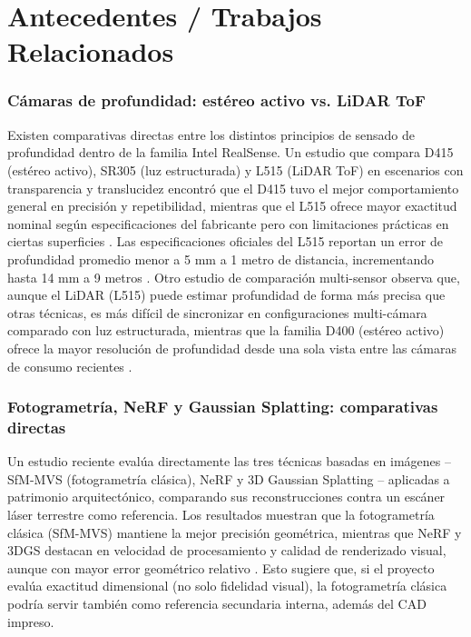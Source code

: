 \documentclass[11pt]{article}
\begin{document}
\section{Antecedentes / Trabajos Relacionados}

\subsubsection*{Cámaras de profundidad: estéreo activo vs. LiDAR ToF}
Existen comparativas directas entre los distintos principios de sensado de profundidad dentro de la familia Intel RealSense. Un estudio que compara D415 (est\'ereo activo), SR305 (luz estructurada) y L515 (LiDAR ToF) en escenarios con transparencia y translucidez encontr\'o que el D415 tuvo el mejor comportamiento general en precisi\'on y repetibilidad, mientras que el L515 ofrece mayor exactitud nominal seg\'un especificaciones del fabricante pero con limitaciones pr\'acticas en ciertas superficies \cite{realsense_transparent}. Las especificaciones oficiales del L515 reportan un error de profundidad promedio menor a 5 mm a 1 metro de distancia, incrementando hasta 14 mm a 9 metros \cite{realsense_l515_specs}. Otro estudio de comparaci\'on multi-sensor observa que, aunque el LiDAR (L515) puede estimar profundidad de forma m\'as precisa que otras t\'ecnicas, es m\'as dif\'icil de sincronizar en configuraciones multi-c\'amara comparado con luz estructurada, mientras que la familia D400 (est\'ereo activo) ofrece la mayor resoluci\'on de profundidad desde una sola vista entre las c\'amaras de consumo recientes \cite{realsense_lidar_multisensor}.

\subsubsection*{Fotogrametr\'ia, NeRF y Gaussian Splatting: comparativas directas}
Un estudio reciente eval\'ua directamente las tres t\'ecnicas basadas en im\'agenes -- SfM-MVS (fotogrametr\'ia cl\'asica), NeRF y 3D Gaussian Splatting -- aplicadas a patrimonio arquitect\'onico, comparando sus reconstrucciones contra un esc\'aner l\'aser terrestre como referencia. Los resultados muestran que la fotogrametr\'ia cl\'asica (SfM-MVS) mantiene la mejor precisi\'on geom\'etrica, mientras que NeRF y 3DGS destacan en velocidad de procesamiento y calidad de renderizado visual, aunque con mayor error geom\'etrico relativo \cite{nerf_gs_sfm_heritage}. Esto sugiere que, si el proyecto eval\'ua exactitud dimensional (no solo fidelidad visual), la fotogrametr\'ia cl\'asica podr\'ia servir tambi\'en como referencia secundaria interna, adem\'as del CAD impreso.
\end{document}

